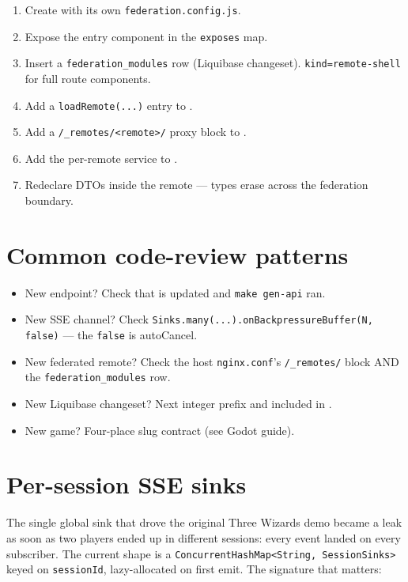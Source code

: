 \documentclass[11pt,a4paper,openany]{book}
\begin{document}
\begin{enumerate}
  \item Create  with its own
        \texttt{federation.config.js}.
  \item Expose the entry component in the \texttt{exposes} map.
  \item Insert a \texttt{federation\_modules} row (Liquibase
        changeset). \texttt{kind=remote-shell} for full route
        components.
  \item Add a \texttt{loadRemote(...)} entry to
        .
  \item Add a \texttt{/\_remotes/<remote>/} proxy block to
        .
  \item Add the per-remote service to .
  \item Redeclare DTOs inside the remote --- types erase across the
        federation boundary.
\end{enumerate}

\chapter{Common code-review patterns}
\begin{itemize}
  \item New endpoint? Check that
         is updated and
        \texttt{make gen-api} ran.
  \item New SSE channel? Check
        \texttt{Sinks.many(...).onBackpressureBuffer(N, false)} ---
        the \texttt{false} is autoCancel.
  \item New federated remote? Check the host
        \texttt{nginx.conf}'s \texttt{/\_remotes/} block AND the
        \texttt{federation\_modules} row.
  \item New Liquibase changeset? Next integer prefix and included in
        .
  \item New game? Four-place slug contract (see Godot guide).
\end{itemize}

\chapter{Per-session SSE sinks}
The single global sink that drove the original Three Wizards demo
became a leak as soon as two players ended up in different sessions:
every event landed on every subscriber. The current shape is a
\texttt{ConcurrentHashMap<String, SessionSinks>} keyed on
\texttt{sessionId}, lazy-allocated on first emit. The signature that
matters:
\end{document}
